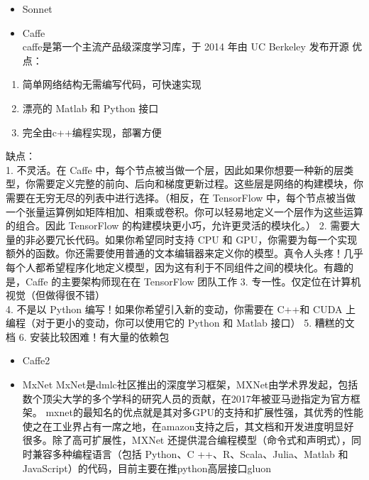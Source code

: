 \begin{itemize}
\item
  Sonnet
\item
  Caffe\\
  caffe是第一个主流产品级深度学习库，于 2014 年由 UC Berkeley 发布开源
  优点：\\
\end{itemize}

\begin{enumerate}
\def\labelenumi{\arabic{enumi}.}
\item
  简单网络结构无需编写代码，可快速实现
\item
  漂亮的 Matlab 和 Python 接口
\item
  完全由c++编程实现，部署方便
\end{enumerate}

缺点：\\
1. 不灵活。在 Caffe
中，每个节点被当做一个层，因此如果你想要一种新的层类型，你需要定义完整的前向、后向和梯度更新过程。这些层是网络的构建模块，你需要在无穷无尽的列表中进行选择。（相反，在
TensorFlow
中，每个节点被当做一个张量运算例如矩阵相加、相乘或卷积。你可以轻易地定义一个层作为这些运算的组合。因此
TensorFlow 的构建模块更小巧，允许更灵活的模块化。） 2.
需要大量的非必要冗长代码。如果你希望同时支持 CPU 和
GPU，你需要为每一个实现额外的函数。你还需要使用普通的文本编辑器来定义你的模型。真令人头疼！几乎每个人都希望程序化地定义模型，因为这有利于不同组件之间的模块化。有趣的是，Caffe
的主要架构师现在在 TensorFlow 团队工作 3.
专一性。仅定位在计算机视觉（但做得很不错）\\
4. 不是以 Python 编写！如果你希望引入新的变动，你需要在 C++和 CUDA
上编程（对于更小的变动，你可以使用它的 Python 和 Matlab 接口） 5.
糟糕的文档 6. 安装比较困难！有大量的依赖包

\begin{itemize}
\item
  Caffe2
\item
  MxNet
  MxNet是dmlc社区推出的深度学习框架，MXNet由学术界发起，包括数个顶尖大学的多个学科的研究人员的贡献，在2017年被亚马逊指定为官方框架。
  mxnet的最知名的优点就是其对多GPU的支持和扩展性强，其优秀的性能使之在工业界占有一席之地，在amazon支持之后，其文档和开发进度明显好很多。除了高可扩展性，MXNet
  还提供混合编程模型（命令式和声明式），同时兼容多种编程语言（包括
  Python、C ++、R、Scala、Julia、Matlab 和
  JavaScript）的代码，目前主要在推python高层接口gluon
\end{itemize}

